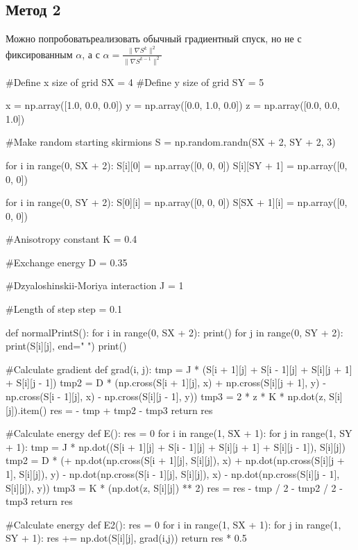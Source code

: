 \documentclass[ 12pt,x11names]{article}
\begin{document}
 \subsection{Метод 2}
 Можно попробоватьреализовать обычный градиентный спуск, но не с фиксированным $\alpha$, а с $\alpha = \frac{\| \nabla S^k \|^2}{\| \nabla S^{k-1} \|^2}$\\
  \begin{python}
#Define  x size of grid
SX = 4
#Define y size of grid
SY = 5

x = np.array([1.0, 0.0, 0.0])
y = np.array([0.0, 1.0, 0.0])
z = np.array([0.0, 0.0, 1.0])

#Make random starting skirmions
S = np.random.randn(SX + 2, SY + 2, 3)

for i in range(0, SX + 2):
    S[i][0] = np.array([0, 0, 0])
    S[i][SY + 1] = np.array([0, 0, 0])

for i in range(0, SY + 2):
    S[0][i] = np.array([0, 0, 0])
    S[SX + 1][i] = np.array([0, 0, 0])

#Anisotropy constant
K = 0.4

#Exchange energy
D = 0.35

#Dzyaloshinskii-Moriya interaction
J = 1

#Length of step
step = 0.1

def normalPrintS():
    for i in range(0, SX + 2):
        print()
        for j in range(0, SY + 2):
            print(S[i][j], end=" ")
    print()

#Calculate gradient
def grad(i, j):
    tmp = J * (S[i + 1][j] + S[i - 1][j] + S[i][j + 1] + S[i][j - 1])
    tmp2 = D * (np.cross(S[i + 1][j], x) + np.cross(S[i][j + 1], y) - np.cross(S[i - 1][j], x) - np.cross(S[i][j - 1], y))
    tmp3 = 2 * z * K * np.dot(z, S[i][j]).item()
    res = - tmp + tmp2 - tmp3
    return res

#Calculate energy
def E():
    res = 0
    for i in range(1, SX + 1):
        for j in range(1, SY + 1):
            tmp = J * np.dot((S[i + 1][j] + S[i - 1][j] + S[i][j + 1] + S[i][j - 1]), S[i][j])
            tmp2 = D * (+ np.dot(np.cross(S[i + 1][j], S[i][j]), x)
                        + np.dot(np.cross(S[i][j + 1], S[i][j]), y)
                        - np.dot(np.cross(S[i - 1][j], S[i][j]), x)
                        - np.dot(np.cross(S[i][j - 1], S[i][j]), y))
            tmp3 = K * (np.dot(z, S[i][j]) ** 2)
            res = res - tmp / 2 - tmp2 / 2 - tmp3
    return res

#Calculate energy
def E2():
    res = 0
    for i in range(1, SX + 1):
        for j in range(1, SY + 1):
            res += np.dot(S[i][j], grad(i,j))
    return res * 0.5


\end{python}
\end{document}
